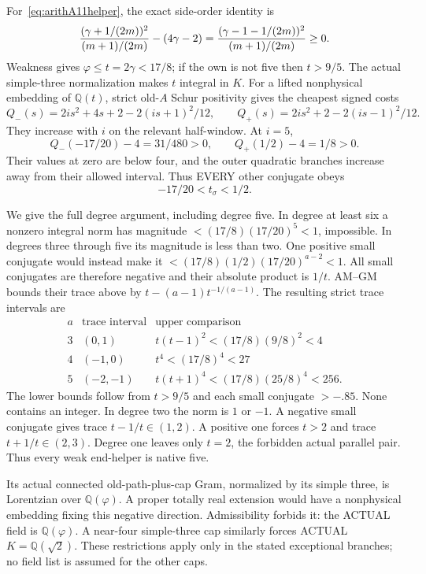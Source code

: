 \documentclass[11pt]{article}
\begin{document}
For~\eqref{eq:arithA11helper}, the exact
side-order identity is
\[
 {(\gamma+1/(2m))^2\over(m+1)/(2m)}
                 -(4\gamma-2)
 ={(\gamma-1-1/(2m))^2\over(m+1)/(2m)}\ge0 .
\]
Weakness gives \(\varphi\le t=2\gamma<17/8\);
if the own is not five then \(t>9/5\).
The actual simple-three normalization makes
\(t\) integral in \(K\).
For a lifted nonphysical embedding of
\(\mathbb Q(t)\), strict old-\(A\) Schur
positivity gives the cheapest signed costs
\[
 Q_-(s)=2is^2+4s+2-2(is+1)^2/12,\qquad
 Q_+(s)=2is^2+2-2(is-1)^2/12 .
\]
They increase with \(i\) on the relevant
half-window.  At \(i=5\),
\[
 Q_-(-17/20)-4=31/480>0,\qquad
 Q_+(1/2)-4=1/8>0 .
\]
Their values at zero are below four, and
the outer quadratic branches increase away
from their allowed interval.
Thus EVERY other conjugate obeys
\[
                    -17/20<t_\sigma<1/2 .
\tag{A11strip}\label{eq:arithA11strip}
\]

We give the full degree argument, including
degree five.  In degree at least six a
nonzero integral norm has magnitude
\(<(17/8)(17/20)^5<1\), impossible.
In degrees three through five its magnitude
is less than two.
One positive small conjugate would instead
make it \(<(17/8)(1/2)(17/20)^{a-2}<1\).
All small conjugates are therefore negative
and their absolute product is \(1/t\).
AM--GM bounds their trace above by
\(t-(a-1)t^{-1/(a-1)}\).
The resulting strict trace intervals are
\[
 \begin{array}{c|c|c}
 a&\text{trace interval}&\text{upper comparison}\\ \hline
 3&(0,1)&t(t-1)^2<(17/8)(9/8)^2<4\\
 4&(-1,0)&t^4<(17/8)^4<27\\
 5&(-2,-1)&t(t+1)^4<(17/8)(25/8)^4<256 .
 \end{array}
\]
The lower bounds follow from
\(t>9/5\) and each small conjugate \(>-.85\).
None contains an integer.
In degree two the norm is \(1\) or \(-1\).
A negative small conjugate gives trace
\(t-1/t\in(1,2)\).
A positive one forces \(t>2\) and trace
\(t+1/t\in(2,3)\).
Degree one leaves only \(t=2\), the
forbidden actual parallel pair.
Thus every weak end-helper is native five.

Its actual connected old-path-plus-cap Gram,
normalized by its simple three, is Lorentzian
over \(\mathbb Q(\varphi)\).
A proper totally real extension would have
a nonphysical embedding fixing this negative
direction.  Admissibility forbids it:
the ACTUAL field is \(\mathbb Q(\varphi)\).
A near-four simple-three cap similarly forces
ACTUAL \(K=\mathbb Q(\sqrt2)\).
These restrictions apply only in the stated
exceptional branches; no field list is assumed
for the other caps.
\end{document}
